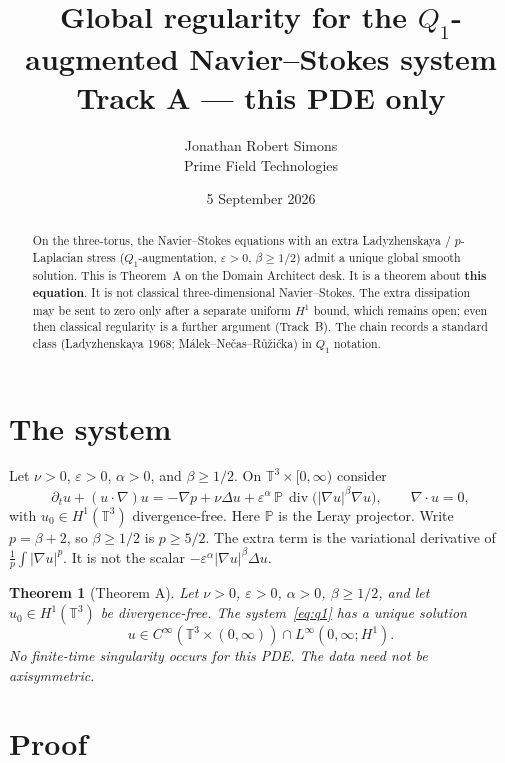 \documentclass[11pt]{article}
\title{Global regularity for the \(Q_1\)-augmented
Navier--Stokes system\\
\large Track A --- this PDE only}
\author{Jonathan Robert Simons\\
Prime Field Technologies}
\date{5 September 2026}
\newtheorem{theorem}{Theorem}
\begin{document}
\maketitle

\begin{abstract}
On the three-torus, the Navier--Stokes equations with an extra
Ladyzhenskaya / \(p\)-Laplacian stress
(\(Q_1\)-augmentation, \(\varepsilon>0\), \(\beta\ge 1/2\))
admit a unique global smooth solution. This is Theorem~A on
the Domain Architect desk. It is a theorem about
\textbf{this equation}. It is not classical three-dimensional
Navier--Stokes. The extra dissipation may be sent to zero
only after a separate uniform \(H^1\) bound, which remains
open; even then classical regularity is a further argument
(Track~B). The chain records a standard class
(Ladyzhenskaya 1968; M\'alek--Ne\v{c}as--R\r{u}\v{z}i\v{c}ka)
in \(Q_1\) notation.
\end{abstract}

\section{The system}

Let \(\nu>0\), \(\varepsilon>0\), \(\alpha>0\), and
\(\beta\ge 1/2\). On \(\mathbb{T}^3\times[0,\infty)\) consider
\begin{equation}
\label{eq:q1}
\partial_t u+(u\cdot\nabla)u
=-\nabla p+\nu\Delta u
+\varepsilon^\alpha\,\mathbb{P}\,
\operatorname{div}\bigl(|\nabla u|^\beta\nabla u\bigr),
\qquad
\nabla\cdot u=0,
\end{equation}
with \(u_0\in H^1(\mathbb{T}^3)\) divergence-free.
Here \(\mathbb{P}\) is the Leray projector.
Write \(p=\beta+2\), so \(\beta\ge 1/2\) is \(p\ge 5/2\).
The extra term is the variational derivative of
\(\frac1p\int|\nabla u|^p\). It is not the scalar
\(-\varepsilon^\alpha|\nabla u|^\beta\Delta u\).

\begin{theorem}[Theorem A]
\label{thm:A}
Let \(\nu>0\), \(\varepsilon>0\), \(\alpha>0\),
\(\beta\ge 1/2\), and let \(u_0\in H^1(\mathbb{T}^3)\) be
divergence-free. The system~\eqref{eq:q1} has a unique
solution
\[
u\in C^\infty(\mathbb{T}^3\times(0,\infty))
\cap L^\infty(0,\infty;H^1).
\]
No finite-time singularity occurs for this PDE.
The data need not be axisymmetric.
\end{theorem}

\section{Proof}
\end{document}
